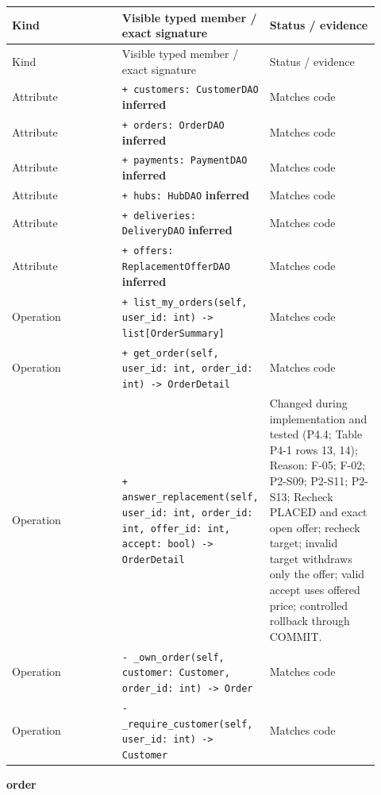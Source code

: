 \begin{longtable}{>{\raggedright\arraybackslash}p{0.3067\linewidth}>{\raggedright\arraybackslash}p{0.3067\linewidth}>{\raggedright\arraybackslash}p{0.3067\linewidth}}
Kind & Visible typed member / exact signature & Status / evidence \\
\hline\endfirsthead
Kind & Visible typed member / exact signature & Status / evidence \\
\hline\endhead
Attribute & \texttt{+ customers: CustomerDAO} \textbf{inferred} & Matches code \\
Attribute & \texttt{+ orders: OrderDAO} \textbf{inferred} & Matches code \\
Attribute & \texttt{+ payments: PaymentDAO} \textbf{inferred} & Matches code \\
Attribute & \texttt{+ hubs: HubDAO} \textbf{inferred} & Matches code \\
Attribute & \texttt{+ deliveries: DeliveryDAO} \textbf{inferred} & Matches code \\
Attribute & \texttt{+ offers: ReplacementOfferDAO} \textbf{inferred} & Matches code \\
Operation & \texttt{+ list\_\allowbreak{}my\_\allowbreak{}orders(self, user\_\allowbreak{}id: int) -\textgreater{} list[OrderSummary]} & Matches code \\
Operation & \texttt{+ get\_\allowbreak{}order(self, user\_\allowbreak{}id: int, order\_\allowbreak{}id: int) -\textgreater{} OrderDetail} & Matches code \\
Operation & \texttt{+ answer\_\allowbreak{}replacement(self, user\_\allowbreak{}id: int, order\_\allowbreak{}id: int, offer\_\allowbreak{}id: int, accept: bool) -\textgreater{} OrderDetail} & Changed during implementation and tested (P4.4; Table P4-1 rows 13, 14); Reason: F-05; F-02; P2-S09; P2-S11; P2-S13; Recheck PLACED and exact open offer; recheck target; invalid target withdraws only the offer; valid accept uses offered price; controlled rollback through COMMIT. \\
Operation & \texttt{- \_\allowbreak{}own\_\allowbreak{}order(self, customer: Customer, order\_\allowbreak{}id: int) -\textgreater{} Order} & Matches code \\
Operation & \texttt{- \_\allowbreak{}require\_\allowbreak{}customer(self, user\_\allowbreak{}id: int) -\textgreater{} Customer} & Matches code \\
\end{longtable}
\textbf{order}


